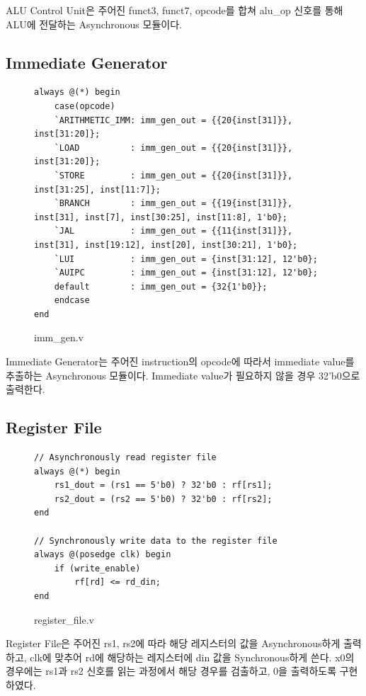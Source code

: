 \documentclass[openright, a4paper]{article}
\begin{document}
ALU Control Unit은 주어진 funct3, funct7, opcode를 합쳐 alu_op 신호를 통해 ALU에 전달하는 Asynchronous 모듈이다.

\subsection{Immediate Generator}

\begin{figure}[!h]
    \begin{verbatim}
always @(*) begin
    case(opcode)
    `ARITHMETIC_IMM: imm_gen_out = {{20{inst[31]}}, inst[31:20]};
    `LOAD          : imm_gen_out = {{20{inst[31]}}, inst[31:20]};
    `STORE         : imm_gen_out = {{20{inst[31]}}, inst[31:25], inst[11:7]};
    `BRANCH        : imm_gen_out = {{19{inst[31]}}, inst[31], inst[7], inst[30:25], inst[11:8], 1'b0};
    `JAL           : imm_gen_out = {{11{inst[31]}}, inst[31], inst[19:12], inst[20], inst[30:21], 1'b0};
    `LUI           : imm_gen_out = {inst[31:12], 12'b0};
    `AUIPC         : imm_gen_out = {inst[31:12], 12'b0};
    default        : imm_gen_out = {32{1'b0}};
    endcase
end
    \end{verbatim}
    \caption{imm_gen.v}
\end{figure}

Immediate Generator는 주어진 instruction의 opcode에 따라서 immediate value를 추출하는 Asynchronous 모듈이다. Immediate value가 필요하지 않을 경우 32'b0으로 출력한다.

\subsection{Register File}

\begin{figure}[h]
    \begin{verbatim}
// Asynchronously read register file
always @(*) begin
    rs1_dout = (rs1 == 5'b0) ? 32'b0 : rf[rs1];
    rs2_dout = (rs2 == 5'b0) ? 32'b0 : rf[rs2];
end

// Synchronously write data to the register file
always @(posedge clk) begin
    if (write_enable)
        rf[rd] <= rd_din;
end
    \end{verbatim}
    \caption{register_file.v}
\end{figure}

Register File은 주어진 rs1, rs2에 따라 해당 레지스터의 값을 Asynchronous하게 출력하고, clk에 맞추어 rd에 해당하는 레지스터에 din 값을 Synchronous하게 쓴다. x0의 경우에는 rs1과 rs2 신호를 읽는 과정에서 해당 경우를 검출하고, 0을 출력하도록 구현하였다.
\end{document}
